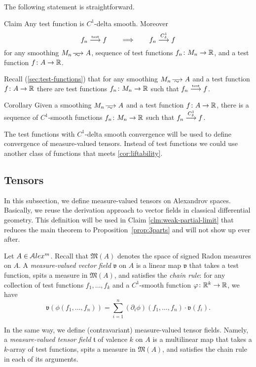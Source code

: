 The following statement is straightforward.

\begin{thm}{Claim}\label{clm:test=>smooth}
Any test function is $C^1$-delta smooth.
Moreover 
\[f_n\stackrel{\text{\tiny\rm test}}{\longrightarrow} f
\qquad\Longrightarrow\qquad
f_n\stackrel{C^1_\delta}{\longrightarrow} f\]
for any smoothing $M_n\smooths{} A$,
sequence of test functions $f_n\:M_n\zz\to\RR$,
and a test function $f\colon A\to\mathbb{R}$.
\end{thm}

Recall (\ref{sec:test-functions}) that for any smoothing $M_n\smooths{} A$ and a test function $f\colon A\to\mathbb{R}$ there are test functions  $f_n\colon M_n\to \mathbb{R}$ such that $f_n\stackrel{\text{\tiny\rm test}}{\longrightarrow} f$.

\begin{thm}{Corollary}\label{cor:liftability}
Given a smoothing $M_n\smooths{} A$ and a test function $f\colon A\to\mathbb{R}$,
there is a sequence of $C^1$-smooth functions $f_n\colon M_n\to \mathbb{R}$ such that $f_n\stackrel{C^1_\delta}{\longrightarrow} f$.
\end{thm}

The test functions with $C^1$-delta smooth convergence will be used to define convergence of measure-valued tensors.
Instead of test functions we could use another class of functions that meets \ref{cor:liftability}.

 
\subsection{Tensors}\label{subsec:tensors}

In this subsection, we define measure-valued tensors on Alexandrov spaces.
Basically, we reuse the derivation approach to vector fields in classical differential geometry.
This definition will be used in Claim \ref{clm:weak-partial-limit} that reduces the main theorem to Proposition~\ref{prop:3parts} and will not show up ever after.

Let $A\in \mathcal{A}lex^m$.
Recall that $\mathfrak M(A)$
denotes the space of signed Radon measures on $A$.
A \emph{measure-valued vector field} $\mathfrak{v}$  on $A$
is a linear map
$\mathfrak{v}$ that takes a test function,
spits a measure in $\mathfrak M(A)$,
and satisfies the \emph{chain rule}:
for any collection of test functions $f_1,\dots,f_k$
and a $C^1$-smooth function $\varphi\colon\mathbb{R}^k\to\mathbb{R}$, we have
$$\mathfrak{v}(\phi(f_1,\dots,f_n))
=
\sum_{i=1}^n (\partial_i\phi)(f_1,\dots,f_n)\cdot\mathfrak{v}(f_i).
$$

In the same way, we define (contravariant) measure-valued tensor fields.
Namely, a \emph{measure-valued tensor field} $\mathfrak{t}$ of valence $k$ on $A$ is a multilinear map that takes a $k$-array of test  functions, spits a measure in $\mathfrak M(A)$, and satisfies the chain rule in each of its arguments.

